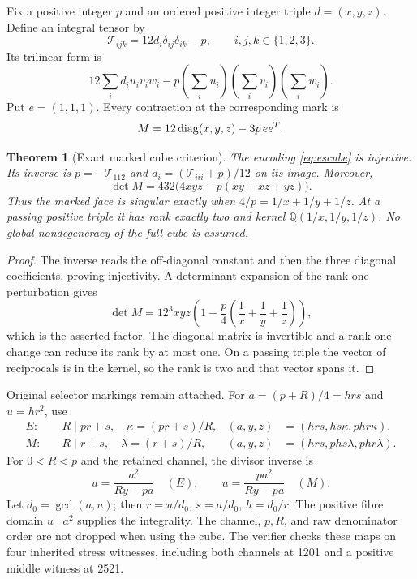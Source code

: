 \documentclass[11pt,reqno]{amsart}
\newtheorem{theorem}{Theorem}[section]
\theoremstyle{definition}\newtheorem{definition}[theorem]{Definition}
\theoremstyle{remark}\newtheorem{remark}[theorem]{Remark}
\newcommand{\Q}{\mathbb Q}\newcommand{\R}{\mathbb R}\newcommand{\C}{\mathbb C}\newcommand{\Z}{\mathbb Z}\newcommand{\OO}{\mathbb O}
\begin{document}
Fix a positive integer $p$ and an ordered positive integer triple $d=(x,y,z)$. Define
an integral tensor by
\begin{equation}\label{eq:escube}
 \mathcal T_{ijk}=12d_i\delta_{ij}\delta_{ik}-p,
 \qquad i,j,k\in\{1,2,3\}.
\end{equation}
Its trilinear form is
\[
 12\sum_i d_i u_iv_iw_i-p\left(\sum_i u_i\right)
 \left(\sum_i v_i\right)\left(\sum_i w_i\right).
\]
Put $e=(1,1,1)$. Every contraction at the corresponding mark is
\begin{equation}\label{eq:esface}
 M=12\operatorname{diag}(x,y,z)-3p\,ee^T.
\end{equation}

\begin{theorem}[Exact marked cube criterion]\label{thm:esembed}
The encoding \eqref{eq:escube} is injective. Its inverse is
$p=-\mathcal T_{112}$ and $d_i=(\mathcal T_{iii}+p)/12$ on its image.
Moreover,
\[
 \det M=432\big(4xyz-p(xy+xz+yz)\big).
\]
Thus the marked face is singular exactly when $4/p=1/x+1/y+1/z$.
At a passing positive triple it has rank exactly two and kernel
$\Q(1/x,1/y,1/z)$. No global nondegeneracy of the full cube is assumed.
\end{theorem}
\begin{proof}
The inverse reads the off-diagonal constant and then the three diagonal
coefficients, proving injectivity. A determinant expansion of the rank-one
perturbation gives
\[
 \det M=12^3xyz\left(1-\frac p4\left(\frac1x+\frac1y+\frac1z\right)\right),
\]
which is the asserted factor. The diagonal matrix is invertible and a rank-one
change can reduce its rank by at most one. On a passing triple the vector of
reciprocals is in the kernel, so the rank is two and that vector spans it.
\end{proof}

Original selector markings remain attached. For $a=(p+R)/4=hrs$ and
$u=hr^2$, use
\begin{align*}
 E:&\quad R\mid pr+s,\quad \kappa=(pr+s)/R,
 &(a,y,z)&=(hrs,hs\kappa,phr\kappa),\\
 M:&\quad R\mid r+s,\quad \lambda=(r+s)/R,
 &(a,y,z)&=(hrs,phs\lambda,phr\lambda).
\end{align*}
For $0<R<p$ and the retained channel, the divisor inverse is
\[
 u=\frac{a^2}{Ry-pa}\quad(E),\qquad
 u=\frac{pa^2}{Ry-pa}\quad(M).
\]
Let $d_0=\gcd(a,u)$; then $r=u/d_0$, $s=a/d_0$, $h=d_0/r$.
The positive fibre domain $u\mid a^2$ supplies the integrality. The channel,
$p,R$, and raw denominator order are not dropped when using the cube.
The verifier checks these maps on four inherited stress witnesses, including
both channels at 1201 and a positive middle witness at 2521.
\end{document}
